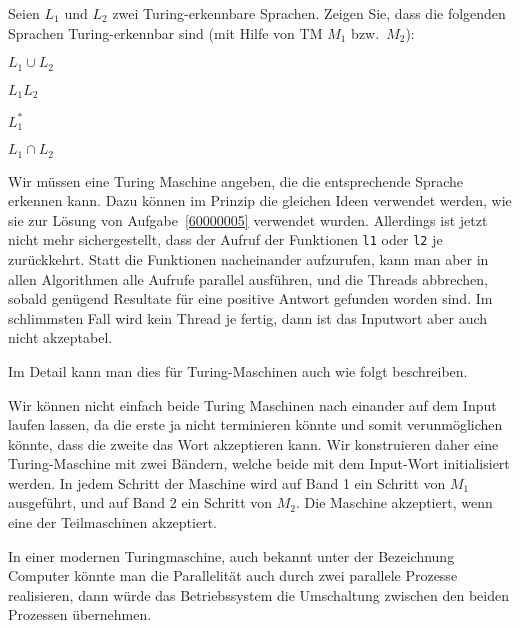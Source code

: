 Seien $L_1$ und $L_2$ zwei Turing-erkennbare Sprachen. Zeigen Sie, dass
die folgenden Sprachen Turing-erkennbar sind (mit Hilfe von TM $M_1$
bzw.~$M_2$):
\begin{teilaufgaben}
\item $L_1\cup L_2$
\item $L_1L_2$
\item $L_1^*$
\item $L_1\cap L_2$
\end{teilaufgaben}


\begin{loesung}
Wir müssen eine Turing Maschine angeben, die die entsprechende
Sprache erkennen kann.
Dazu können im Prinzip die gleichen Ideen verwendet werden, wie sie
zur Lösung von Aufgabe~\ref{60000005} verwendet wurden.
Allerdings ist jetzt nicht mehr sichergestellt, dass der Aufruf
der Funktionen \texttt{l1} oder \texttt{l2} je zurückkehrt.
Statt die Funktionen nacheinander aufzurufen, kann man aber in allen
Algorithmen alle Aufrufe parallel ausführen, und die Threads abbrechen,
sobald genügend Resultate für eine positive Antwort gefunden worden
sind. Im schlimmsten Fall wird kein Thread je fertig, dann ist das
Inputwort aber auch nicht akzeptabel.

Im Detail kann man dies für Turing-Maschinen auch wie folgt
beschreiben.
\begin{teilaufgaben}
\item
Wir können nicht einfach beide Turing Maschinen nach einander
auf dem Input laufen lassen, da die erste ja nicht terminieren könnte und
somit verunmöglichen könnte, dass die zweite das Wort akzeptieren kann.
Wir konstruieren daher eine Turing-Maschine mit zwei Bändern, welche
beide mit dem Input-Wort initialisiert werden.
In jedem Schritt der Maschine wird auf Band 1 ein Schritt von $M_1$
ausgeführt, und auf Band 2 ein Schritt von $M_2$.
Die Maschine akzeptiert, wenn eine der Teilmaschinen
akzeptiert.

In einer modernen Turingmaschine, auch bekannt unter der Bezeichnung
Computer könnte man die Parallelität auch durch zwei parallele
Prozesse realisieren, dann würde das Betriebssystem die Umschaltung
zwischen den beiden Prozessen übernehmen.


\end{teilaufgaben}
\end{loesung}
